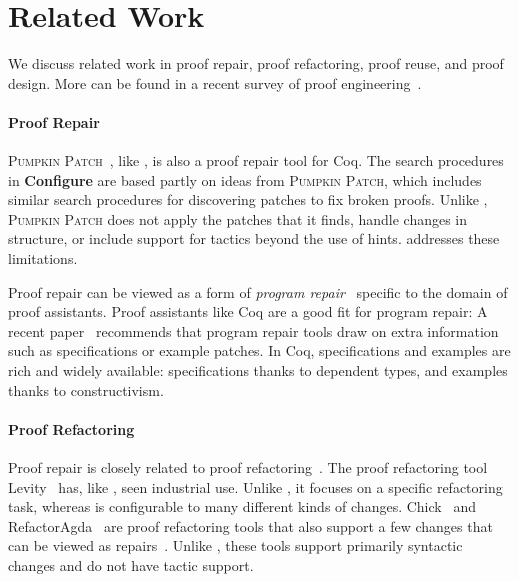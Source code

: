 \section{Related Work}
\label{sec:related}


We discuss related work in proof repair, proof refactoring, proof reuse, and proof design.
More can be found in a recent survey of proof engineering~\cite{PGL-045}.

\paragraph{Proof Repair}

\textsc{Pumpkin Patch}~\cite{pumpkinpatch}, like \toolname, is also a proof repair tool for Coq.
The search procedures in \textbf{Configure} are based partly on ideas from \textsc{Pumpkin Patch}, which includes
similar search procedures for discovering patches to fix broken proofs.
Unlike \toolname, \textsc{Pumpkin Patch} does not apply the patches that it finds,
handle changes in structure, or include support for tactics beyond the use of hints.
\toolname addresses these limitations.

Proof repair can be viewed as a form of \textit{program repair}~\cite{Monperrus:2018:ASR:3177787.3105906, Gazzola:2018:ASR:3180155.3182526}
specific to the domain of proof assistants.
Proof assistants like Coq are a good fit for program repair: A recent paper~\cite{Qi:2015:APP:2771783.2771791} 
recommends that program repair tools draw on extra information
such as specifications or example patches. In Coq, specifications and examples 
are rich and widely available: specifications thanks to dependent types,
and examples thanks to constructivism.

\paragraph{Proof Refactoring}

Proof repair is closely related to proof refactoring~\cite{WhitesidePhD}. 
The proof refactoring tool Levity~\cite{Bourke12} has, like \toolname, seen industrial use.
Unlike \toolname, it focuses on a specific refactoring task, whereas \toolname is configurable to many different kinds of changes.
Chick~\cite{robert2018} and RefactorAgda~\cite{wibergh2019} are proof refactoring tools that
also support a few changes that can be viewed as repairs~\cite{PGL-045}.
Unlike \toolname, these tools support primarily syntactic changes and do not have tactic support.

